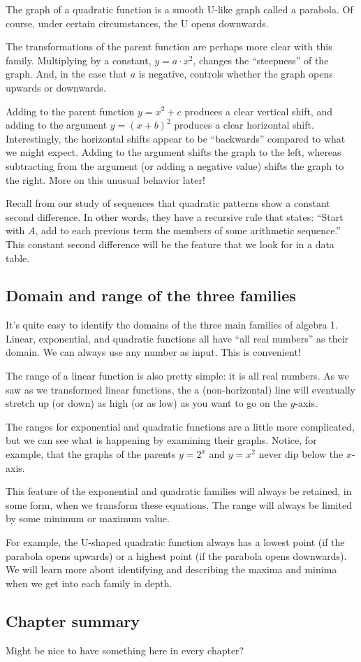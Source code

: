 The graph of a quadratic function is a smooth U-like graph called a \gls{parabola}. Of course, under certain circumstances, the U opens downwards.

The transformations of the parent function are perhaps more clear with this family. Multiplying by a constant, $y=a \cdot x^2$, changes the ``steepness'' of the graph. And, in the case that $a$ is negative, controls whether the graph opens upwards or downwards.

Adding to the parent function $y=x^2+c$ produces a clear vertical shift, and adding to the argument $y=(x+b)^2$ produces a clear horizontal shift. Interestingly, the horizontal shifts appear to be ``backwards'' compared to what we might expect. Adding to the argument shifts the graph to the left, whereas subtracting from the argument (or adding a negative value) shifts the graph to the right. More on this unusual behavior later!

Recall from our study of sequences that quadratic patterns show a constant second difference. In other words, they have a recursive rule that states: ``Start with $A$, add to each previous term the members of some arithmetic sequence.'' This constant second difference will be the feature that we look for in a data table.


\subsection{Domain and range of the three families}

It's quite easy to identify the domains of the three main families of algebra 1. Linear, exponential, and quadratic functions all have ``all real numbers'' as their domain. We can always use any number as input. This is convenient!

The range of a linear function is also pretty simple: it is all real numbers. As we saw as we transformed linear functions, the a (non-horizontal) line will eventually stretch up (or down) as high (or as low) as you want to go on the $y$-axis.

The ranges for exponential and quadratic functions are a little more complicated, but we can see what is happening by examining their graphs. Notice, for example, that the graphs of the parents $y=2^x$ and $y=x^2$ never dip below the $x$-axis.

This feature of the exponential and quadratic families will always be retained, in some form, when we transform these equations. The range will always be limited by some minimum or maximum value. 

For example, the U-shaped quadratic function always has a lowest point (if the parabola opens upwards) or a highest point (if the parabola opens downwards). We will learn more about identifying and describing the maxima and minima when we get into each family in depth.


\subsection*{Chapter summary}

Might be nice to have something here in every chapter?
